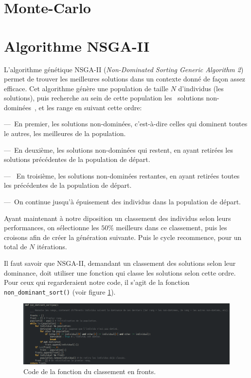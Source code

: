 \documentclass[11pt, a4paper, oneside, portrait]{report}
\begin{document}
    \section*{Monte-Carlo}


    \section*{Algorithme NSGA-II}
        L'algorithme génétique NSGA-II (\emph{Non-Dominated Sorting Generic Algorithm 2}) permet de trouver les meilleures solutions dans un contexte donné de façon assez efficace.
        Cet algorithme génère une population de taille $N$ d'individus (les solutions), puis recherche au sein de cette population les \guillemotleft{}~solutions non-dominées~\guillemotright{}, et les range en suivant cette ordre:

        ---~En premier, les solutions non-dominées, c'est-à-dire celles qui dominent toutes le autres, les meilleures de la population.

        ---~En deuxième, les solutions non-dominées qui restent, en ayant retirées les solutions précédentes de la population de départ.

        ---~ En troisième, les solutions non-dominées restantes, en ayant retirées toutes les précédentes de la population de départ.

        ---~On continue jusqu'à épuisement des individus dans la population de départ.

        Ayant maintenant à notre diposition un classement des individus selon leurs performances, on sélectionne les $50\%{}$ meilleurs dans ce classement, puis les croisons afin de créer la génération suivante.
        Puis le cycle recommence, pour un total de $N$ itérations.

        Il faut savoir que NSGA-II, demandant un classement des solutions selon leur dominance, doit utiliser une fonction qui classe les solutions selon cette ordre. Pour ceux qui regarderaient notre code, il s'agit de la fonction \texttt{non\_dominant\_sort()} (voir figure \ref{fig:non_dominant_sort}).

        \begin{figure}[H]
            \centering
            \includegraphics[width=\textwidth]{Figures/non_dominant_sort.png}
            \caption{Code de la fonction du classement en fronts.}
            \label{fig:non_dominant_sort}
        \end{figure}
\end{document}
